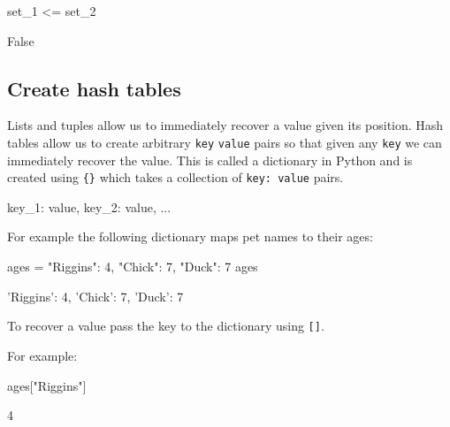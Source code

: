 \begin{pyin}
set_1 <= set_2
\end{pyin}





\begin{raw}
False
\end{raw}





\subsection{Create hash tables}
\label{sec:create_hash_tables}

Lists and tuples allow us to immediately recover a value given its position.
Hash tables allow us to create arbitrary \texttt{key} \texttt{value} pairs so that given any
\texttt{key} we can immediately recover the value. This is called a dictionary in
Python and is created using \texttt{\{\}} which takes a collection of \texttt{key: value}
pairs.


\begin{api}
{key_1: value, key_2: value, ...}
\end{api}



For example the following dictionary maps pet names to their ages:




\begin{pyin}
ages = {"Riggins": 4, "Chick": 7, "Duck": 7}
ages
\end{pyin}





\begin{raw}
{'Riggins': 4, 'Chick': 7, 'Duck': 7}
\end{raw}





To recover a value pass the key to the dictionary using \texttt{{[}{]}}.


For example:




\begin{pyin}
ages["Riggins"]
\end{pyin}





\begin{raw}
4
\end{raw}





